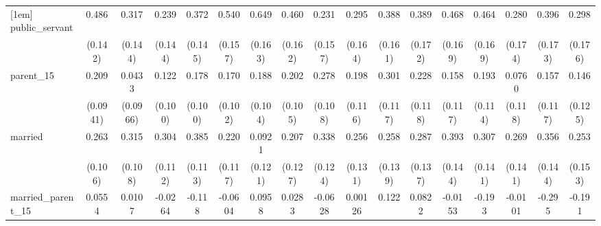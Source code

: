 {\begin{tabular}{l*{16}{c}}
[1em]
public\_servant      &       0.486\sym{***}&       0.317\sym{*}  &       0.239         &       0.372\sym{*}  &       0.540\sym{***}&       0.649\sym{***}&       0.460\sym{**} &       0.231         &       0.295         &       0.388\sym{*}  &       0.389\sym{*}  &       0.468\sym{**} &       0.464\sym{**} &       0.280         &       0.396\sym{*}  &       0.298         \\
                    &     (0.142)         &     (0.144)         &     (0.144)         &     (0.145)         &     (0.157)         &     (0.163)         &     (0.162)         &     (0.157)         &     (0.164)         &     (0.161)         &     (0.172)         &     (0.169)         &     (0.169)         &     (0.174)         &     (0.173)         &     (0.176)         \\
[1em]
parent\_15           &       0.209\sym{*}  &      0.0433         &       0.122         &       0.178         &       0.170         &       0.188         &       0.202         &       0.278\sym{*}  &       0.198         &       0.301\sym{*}  &       0.228         &       0.158         &       0.193         &      0.0760         &       0.157         &       0.146         \\
                    &    (0.0941)         &    (0.0966)         &     (0.100)         &     (0.100)         &     (0.102)         &     (0.104)         &     (0.105)         &     (0.108)         &     (0.116)         &     (0.117)         &     (0.118)         &     (0.117)         &     (0.114)         &     (0.118)         &     (0.117)         &     (0.125)         \\
[1em]
married             &       0.263\sym{*}  &       0.315\sym{**} &       0.304\sym{**} &       0.385\sym{***}&       0.220         &      0.0921         &       0.207         &       0.338\sym{**} &       0.256         &       0.258         &       0.287\sym{*}  &       0.393\sym{**} &       0.307\sym{*}  &       0.269         &       0.356\sym{*}  &       0.253         \\
                    &     (0.106)         &     (0.108)         &     (0.112)         &     (0.113)         &     (0.117)         &     (0.121)         &     (0.127)         &     (0.124)         &     (0.131)         &     (0.139)         &     (0.137)         &     (0.144)         &     (0.141)         &     (0.141)         &     (0.144)         &     (0.153)         \\
[1em]
married\_parent\_15   &      0.0554         &      0.0107         &     -0.0264         &      -0.118         &     -0.0604         &      0.0958         &      0.0283         &     -0.0628         &     0.00126         &       0.122         &      0.0822         &     -0.0153         &      -0.193         &     -0.0101         &      -0.295         &      -0.191         \\

\end{tabular}}
